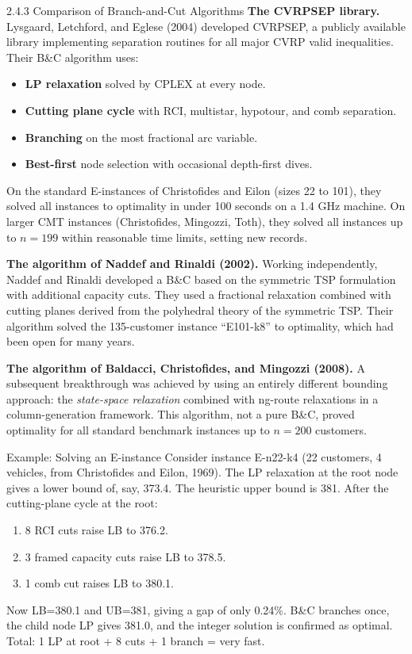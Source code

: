 \documentclass[aspectratio=169,10pt]{beamer}
\begin{document}
\begin{frame}[allowframebreaks]{2.4.3 Comparison of Branch-and-Cut Algorithms}
  \textbf{The CVRPSEP library.} Lysgaard, Letchford, and Eglese (2004)
  developed CVRPSEP, a publicly available library implementing separation
  routines for all major CVRP valid inequalities. Their B\&C algorithm uses:
  \begin{itemize}
    \item \textbf{LP relaxation} solved by CPLEX at every node.
    \item \textbf{Cutting plane cycle} with RCI, multistar, hypotour, and
          comb separation.
    \item \textbf{Branching} on the most fractional arc variable.
    \item \textbf{Best-first} node selection with occasional depth-first dives.
  \end{itemize}
  On the standard E-instances of Christofides and Eilon (sizes 22 to 101),
  they solved all instances to optimality in under 100 seconds on a 1.4 GHz
  machine. On larger CMT instances (Christofides, Mingozzi, Toth), they solved
  all instances up to $n=199$ within reasonable time limits, setting new
  records.

  \framebreak

  \textbf{The algorithm of Naddef and Rinaldi (2002).} Working independently,
  Naddef and Rinaldi developed a B\&C based on the symmetric TSP formulation
  with additional capacity cuts. They used a fractional relaxation combined
  with cutting planes derived from the polyhedral theory of the symmetric
  TSP. Their algorithm solved the 135-customer instance ``E101-k8'' to
  optimality, which had been open for many years.

  \bigskip
  \textbf{The algorithm of Baldacci, Christofides, and Mingozzi (2008).}
  A subsequent breakthrough was achieved by using an entirely different
  bounding approach: the \emph{state-space relaxation} combined with
  ng-route relaxations in a column-generation framework. This algorithm,
  not a pure B\&C, proved optimality for all standard benchmark instances
  up to $n=200$ customers.

  \framebreak

  \begin{exampleblock}{Example: Solving an E-instance}
    Consider instance E-n22-k4 (22 customers, 4 vehicles, from Christofides
    and Eilon, 1969). The LP relaxation at the root node gives a lower bound
    of, say, 373.4. The heuristic upper bound is 381. After the cutting-plane
    cycle at the root:
    \begin{enumerate}
      \item 8 RCI cuts raise LB to 376.2.
      \item 3 framed capacity cuts raise LB to 378.5.
      \item 1 comb cut raises LB to 380.1.
    \end{enumerate}
    Now LB=380.1 and UB=381, giving a gap of only 0.24\%. B\&C branches
    once, the child node LP gives 381.0, and the integer solution is confirmed
    as optimal. Total: 1 LP at root + 8 cuts + 1 branch = very fast.
  \end{exampleblock}
\end{frame}
\end{document}
